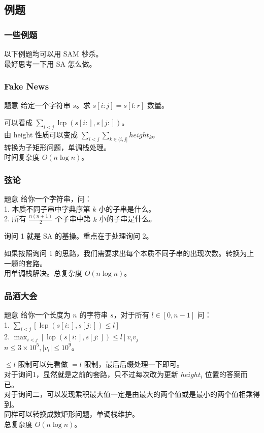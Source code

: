 \documentclass[UTF8]{beamer}
\newcommand{\lcp}{\operatorname{lcp}}
\begin{document}
\begin{CJK}{UTF8}{song}
\subsection{例题}
\begin{frame}
	\frametitle{一些例题}
	以下例题均可以用 SAM 秒杀。\\
	最好思考一下用 SA 怎么做。
\end{frame}
\begin{frame}
	\frametitle{Fake News}
	\begin{block}{题意}
		给定一个字符串 $s$。求 $s[i:j]=s[l:r]$ 数量。
	\end{block}
	\pause
	\par
	可以看成 $\sum_{i<j}\lcp(s[i:],s[j:])$。\\
	由 height 性质可以变成 $\sum_{i<j}\sum_{k\in(i,j]}height_k$。\\
	转换为子矩形问题，单调栈处理。\\
	时间复杂度 $O(n\log n)$。
\end{frame}
\begin{frame}
	\frametitle{弦论}
	\begin{block}{题意}
		给你一个字符串，问：\\
		1. 本质不同子串中字典序第 $k$ 小的子串是什么。\\
		2. 所有 $\frac {n(n+1)}2$ 个子串中第 $k$ 小的子串是什么。
	\end{block}
	\pause
	\par
	询问 1 就是 SA 的基操。重点在于处理询问 2。
	\pause
	\par
	如果按照询问 1 的思路，我们需要求出每个本质不同子串的出现次数。转换为上一题的套路。\\
	用单调栈解决。总复杂度 $O(n\log n)$。
\end{frame}
\begin{frame}
	\frametitle{品酒大会}
	\begin{block}{题意}
		给你一个长度为 $n$ 的字符串 $s$，对于所有 $l\in[0,n-1]$ 问：\\
		1. $\sum_{i<j}[\lcp(s[i:],s[j:])\leq l]$\\
		2. $\max_{i<j}[\lcp(s[i:],s[j:])\leq l]v_iv_j$\\
		$n\leq 3\times 10^5,|v_i|\leq 10^9$。
	\end{block}
	$\leq l$ 限制可以先看做 $=l$ 限制，最后后缀处理一下即可。\\
	对于询问1，显然就是之前的套路，只不过每次改为更新 $height_i$ 位置的答案而已。\\
	\pause
	对于询问二，可以发现乘积最大值一定是由最大的两个值或是最小的两个值相乘得到。\\
	同样可以转换成数矩形问题，单调栈维护。\\
	总复杂度 $O(n\log n)$。
\end{frame}

\end{CJK}
\end{document}
